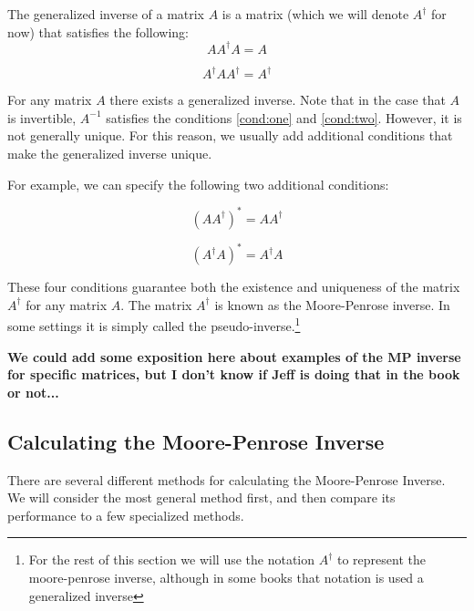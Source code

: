 
 
The generalized inverse of a matrix $A$ is a matrix (which we will denote $A^\dagger$ for now) that satisfies the following:
\begin{equation} \label{cond:one}
AA^\dagger A = A 
\end{equation}

\begin{equation} \label{cond:two}
A^\dagger A A^\dagger = A^\dagger 
\end{equation}

For any matrix $A$ there exists a generalized inverse. Note that in the case that $A$ is invertible, $A^{-1}$ satisfies the conditions \ref{cond:one} and \ref{cond:two}. However, it is not generally unique. For this reason, we usually add additional conditions that make the generalized inverse unique.

For example, we can specify the following two additional conditions:

\begin{equation} \label{cond:three}
(AA^\dagger)^* = AA^\dagger
\end{equation}

\begin{equation} \label{cond:four}
(A^\dagger A)^* = A^\dagger A
\end{equation}

These four conditions guarantee both the existence and uniqueness of the matrix $A^\dagger$ for any matrix $A$. The matrix $A^\dagger$ is known as the Moore-Penrose inverse. In some settings it is simply called the pseudo-inverse.\footnote{For the rest of this section we will use the notation $A^\dagger$ to represent the moore-penrose inverse, although in some books that notation is used a generalized inverse}

{\bf We could add some exposition here about examples of the MP inverse for specific matrices, but I don't know if Jeff is doing that in the book or not...}

\subsection{Calculating the Moore-Penrose Inverse}

There are several different methods for calculating the Moore-Penrose Inverse. We will consider the most general method first, and then compare its performance to a few specialized methods.

